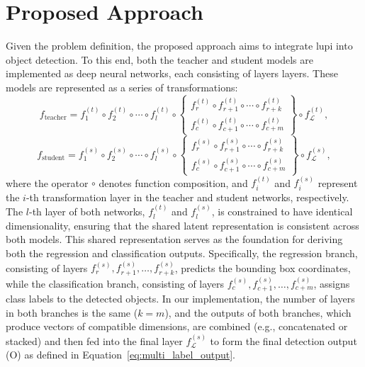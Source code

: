 \section{Proposed Approach}
\label{sec:4_proposed_approach}

Given the problem definition, the proposed approach aims to integrate \gls{lupi} into object detection. To this end, both the \gls{teacher} and \gls{student} models are implemented as deep neural networks, each consisting of \gls{layers} layers. These models are represented as a series of transformations:
\begin{equation}
f_{\text{teacher}} = f_1^{(t)} \circ f_2^{(t)} \circ \cdots \circ f_{l}^{(t)} \circ 
\left\{
  \begin{array}{l}
    f_r^{(t)} \circ f_{r+1}^{(t)} \circ \cdots \circ f_{r+k}^{(t)} \\
    f_c^{(t)} \circ f_{c+1}^{(t)} \circ \cdots \circ f_{c+m}^{(t)}
  \end{array}
\right\} \circ f_\mathcal{L}^{(t)},
\end{equation}
\begin{equation}
f_{\text{student}} = f_1^{(s)} \circ f_2^{(s)} \circ \cdots \circ f_{l}^{(s)} \circ 
\left\{
  \begin{array}{l}
    f_r^{(s)} \circ f_{r+1}^{(s)} \circ \cdots \circ f_{r+k}^{(s)} \\
    f_c^{(s)} \circ f_{c+1}^{(s)} \circ \cdots \circ f_{c+m}^{(s)}
  \end{array}
\right\} \circ f_\mathcal{L}^{(s)},
\end{equation}
where the operator \( \circ \) denotes function composition, and \( f_i^{(t)} \) and \( f_i^{(s)} \) represent the \( i \)-th transformation layer in the teacher and student networks, respectively. The \( l \)-th layer of both networks, \( f_l^{(t)} \) and \( f_l^{(s)} \), is constrained to have identical dimensionality, ensuring that the shared latent representation is consistent across both models. This shared representation serves as the foundation for deriving both the regression and classification outputs. 
Specifically, the regression branch, consisting of layers $f_r^{(s)}, f_{r+1}^{(s)}, \dots, f_{r+k}^{(s)}$, predicts the bounding box coordinates, while the classification branch, consisting of layers $f_c^{(s)}, f_{c+1}^{(s)}, \dots, f_{c+m}^{(s)}$, assigns class labels to the detected objects. In our implementation, the number of layers in both branches is the same ($k = m$), and the outputs of both branches, which produce vectors of compatible dimensions, are combined (e.g., concatenated or stacked) and then fed into the final layer $f_\mathcal{L}^{(s)}$ to form the final detection output (\gls{O}) as defined in Equation~\ref{eq:multi_label_output}.

